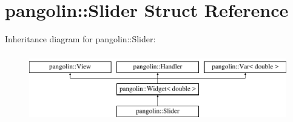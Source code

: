 \hypertarget{structpangolin_1_1_slider}{}\section{pangolin\+:\+:Slider Struct Reference}
\label{structpangolin_1_1_slider}
Inheritance diagram for pangolin\+:\+:Slider\+:\begin{figure}[H]
\begin{center}
\leavevmode
\includegraphics[height=3.000000cm]{structpangolin_1_1_slider}
\end{center}
\end{figure}
